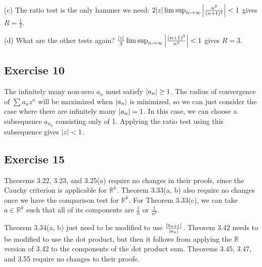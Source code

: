(c) The ratio test is the only hammer we need: $2 \abs{z} \limsup_{n \to \infty} \abs{\frac{n^2}{(n+1)^2}} < 1$ 
gives $R = \frac{1}{2}$.

(d) What are the other tests again? $\frac{\abs{z}}{3} \limsup_{n \to \infty} \abs{\frac{(n + 1)^3}{n^3}} < 1$ 
gives $R = 3$.

\subsection{Exercise 10}
The infinitely many non-zero $a_n$ must satisfy $\abs{a_n} \geq 1$. The radius of convergence of $\sum a_n z^n$ 
will be maximized when $\abs{a_n}$ is minimized, so we can just consider the case where there are infinitely many
$\abs{a_n} = 1$. In this case, we can choose a subsequence $a_{n_k}$ consisting only of 1. Applying the ratio
test using this subsequence gives  $\abs{z} < 1$.

\subsection{Exercise 15}
Theorems 3.22, 3.23, and 3.25(a) require no changes in their proofs, since the Cauchy criterion 
is applicable for $\mathbb{R}^k$. Theorem 3.33(a, b) also require no
changes once we have the comparison test for $\mathbb{R}^k$. For Theorem 3.33(c), we can take 
$a \in \mathbb{R}^k$ such that all of its components are $\frac{1}{n}$ or $\frac{1}{n^2}$.

Theorem 3.34(a, b) just need to be modified to use $\frac{\abs{a_{n+1}}}{\abs{a_n}}$. 
Theorem 3.42 needs to be modified to use the dot product, but then it follows from applying
the $\mathbb{R}$ version of 3.42 to the components of the dot product sum.
Theorems 3.45, 3.47, and 3.55 require no changes to their proofs.
